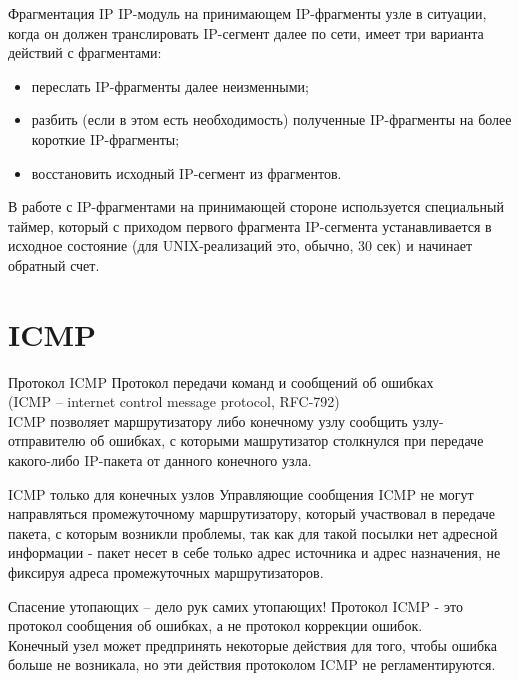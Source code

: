\begin{frame}{Фрагментация IP}
IP-модуль на принимающем IP-фрагменты узле в ситуации,  когда он должен транслировать IP-сегмент далее по сети,  имеет три варианта действий с фрагментами:
	\begin{itemize}
		\item переслать IP-фрагменты далее неизменными;
		\item разбить (если в этом есть необходимость) полученные IP-фрагменты на более короткие IP-фрагменты;
		\item восстановить исходный IP-сегмент из фрагментов.
	\end{itemize}
 В работе с IP-фрагментами на принимающей стороне используется специальный таймер,  который с приходом первого фрагмента IP-сегмента устанавливается в исходное состояние (для UNIX-реализаций это,  обычно,  30 сек) и начинает обратный счет.
\end{frame}

\section{ICMP}
\begin{frame}{Протокол ICMP}
	Протокол передачи команд и сообщений об ошибках \\
	(ICMP -- internet control message protocol, RFC-792)\\
	\pause
	\bigskip
ICMP позволяет маршрутизатору либо конечному узлу сообщить узлу-отправителю об ошибках,  
с которыми машрутизатор столкнулся при передаче какого-либо IP-пакета от данного конечного узла.
\end{frame}

\begin{frame}{ICMP только для конечных узлов}
Управляющие сообщения ICMP не могут направляться промежуточному маршрутизатору,
 который участвовал в передаче пакета,  с которым возникли проблемы,  так как для такой посылки нет адресной информации - пакет несет в себе только адрес источника и адрес назначения,  не фиксируя адреса промежуточных маршрутизаторов.
\end{frame}

\begin{frame}{Спасение утопающих -- дело рук самих утопающих!}
	Протокол ICMP - это протокол сообщения об ошибках,  а не протокол коррекции ошибок.\\
	\bigskip
	Конечный узел может предпринять некоторые действия для того,  чтобы ошибка больше не возникала,  но эти действия протоколом ICMP не регламентируются.
\end{frame}

